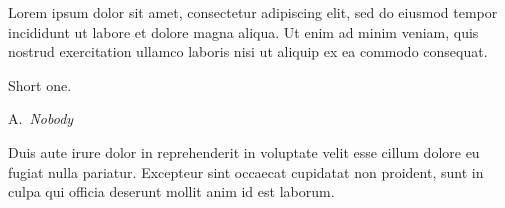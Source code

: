 \documentclass[12pt,oneside]{memoir}
\begin{document}
Lorem ipsum dolor sit amet, consectetur adipiscing elit, sed do eiusmod tempor incididunt ut labore et dolore magna aliqua. Ut enim ad minim veniam, quis nostrud exercitation ullamco laboris nisi ut aliquip ex ea commodo consequat.

\epigraph{Short one.}{A.\ \textit{Nobody}}
Duis aute irure dolor in reprehenderit in voluptate velit esse cillum dolore eu fugiat nulla pariatur. Excepteur sint occaecat cupidatat non proident, sunt in culpa qui officia deserunt mollit anim id est laborum.
\end{document}
